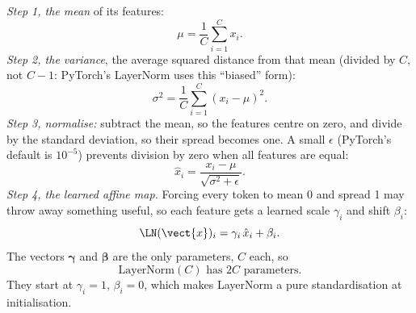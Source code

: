 \emph{Step 1, the mean} of its features:
\begin{equation}\label{eq:block:mu}
  \mu = \frac{1}{C}\sum_{i=1}^{C} x_i .
\end{equation}
\emph{Step 2, the variance}, the average squared distance from that mean (divided by $C$, not
$C-1$: PyTorch's LayerNorm uses this ``biased'' form):
\begin{equation}\label{eq:block:var}
  \sigma^2 = \frac{1}{C}\sum_{i=1}^{C} (x_i - \mu)^2 .
\end{equation}
\emph{Step 3, normalise:} subtract the mean, so the features centre on zero, and divide by the
standard deviation, so their spread becomes one. A small $\epsilon$ (PyTorch's default is
$10^{-5}$) prevents division by zero when all features are equal:
\begin{equation}\label{eq:block:norm}
  \hat x_i = \frac{x_i - \mu}{\sqrt{\sigma^2 + \epsilon}} .
\end{equation}
\emph{Step 4, the learned affine map.} Forcing every token to mean 0 and spread 1 may throw away
something useful, so each feature gets a learned scale $\gamma_i$ and shift $\beta_i$:
\begin{equation}\label{eq:block:ln}
  \LN(\vect{x})_i = \gamma_i\,\hat x_i + \beta_i .
\end{equation}
The vectors $\boldsymbol{\gamma}$ and $\boldsymbol{\beta}$ are the only parameters, $C$ each, so
\begin{equation}\label{eq:block:lnparams}
  \text{LayerNorm}(C) \text{ has } 2C \text{ parameters}.
\end{equation}
They start at $\gamma_i = 1$, $\beta_i = 0$, which makes LayerNorm a pure standardisation at
initialisation.

